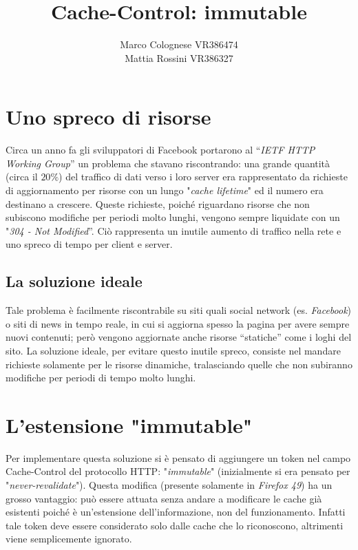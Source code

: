 \documentclass[a4paper,12pt]{report}
\begin{document}
\title{Cache-Control: immutable}
\author{Marco Colognese VR386474\\ Mattia Rossini VR386327}\date{}
\maketitle



\tableofcontents


\chapter{Uno spreco di risorse}
Circa un anno fa gli sviluppatori di Facebook portarono al “{\itshape IETF HTTP Working Group}” un problema che stavano riscontrando: una grande quantità (circa il $20\%$) del traffico di dati verso i loro server era rappresentato da richieste di aggiornamento per risorse con un lungo "{\itshape cache lifetime}" ed il numero era destinano a crescere.
Queste richieste, poiché riguardano risorse che non subiscono modifiche per periodi molto lunghi, vengono sempre liquidate con un "{\itshape 304 - Not Modified}”.
Ciò rappresenta un inutile aumento di traffico nella rete e uno spreco di tempo per client e server.



\section{La soluzione ideale}
Tale problema è facilmente riscontrabile su siti quali social network (es. {\itshape Facebook}) o siti di news in tempo reale, in cui si aggiorna spesso la pagina per avere sempre nuovi contenuti; però vengono aggiornate anche risorse “statiche” come i loghi del sito.
La soluzione ideale, per evitare questo inutile spreco, consiste nel mandare richieste solamente per le risorse dinamiche, tralasciando quelle che non subiranno modifiche per periodi di tempo molto lunghi.



\chapter{L'estensione "immutable"}
Per implementare questa soluzione si è pensato di aggiungere un token nel campo Cache-Control del protocollo HTTP: "{\itshape immutable}" (inizialmente si era pensato per "{\itshape never-revalidate}").
Questa modifica (presente solamente in {\itshape Firefox 49}) ha un grosso vantaggio: può essere attuata senza andare a modificare le cache già esistenti poiché è un’estensione dell’informazione, non del funzionamento. Infatti tale token deve essere considerato solo dalle cache che lo riconoscono, altrimenti viene semplicemente ignorato.
\end{document}
